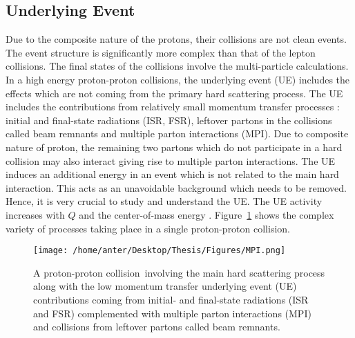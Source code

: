 \subsection{Underlying Event}
Due to the composite nature of the protons, their collisions are not clean events. The event structure is significantly more complex than that of the lepton collisions. The final states of the collisions involve the multi-particle calculations. In a high energy proton-proton collisions, the underlying event (UE) includes the effects which are not coming from the primary hard scattering process. The UE includes the contributions from relatively small momentum transfer processes : initial and final-state radiations (ISR, FSR), leftover partons in the collisions called beam remnants and multiple parton interactions (MPI). Due to composite nature of proton, the remaining two partons which do not participate in a hard collision may also interact giving rise to multiple parton interactions. The UE induces an additional energy in an event which is not related to the main hard interaction. This acts as an unavoidable background which needs to be removed. Hence, it is very crucial to study and understand the UE. The UE activity increases with $Q$ and the center-of-mass energy \cme. Figure~\ref{fig:MPI} shows the complex variety of processes taking place in a single proton-proton collision.

\begin{figure}[!h]
\begin{center}
\hspace*{-7mm}
\texttt{[image: /home/anter/Desktop/Thesis/Figures/MPI.png]}\\
\vspace*{4mm}
\caption[A proton-proton collision involving the main hard scattering process along with the low momentum transfer underlying event (UE) contributions.]{A proton-proton collision\footnotemark~involving the main hard scattering process along with the low momentum transfer underlying event (UE) contributions coming from initial- and final-state radiations (ISR and FSR) complemented with multiple parton interactions (MPI) and collisions from leftover partons called beam remnants.}
\label{fig:MPI}
\end{center}
\end{figure}

